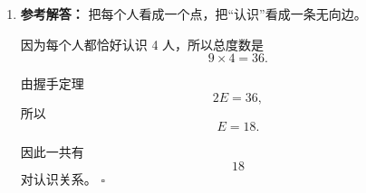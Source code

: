 \documentclass[11pt,a4paper,fontset=fandol]{ctexart}
\newenvironment{solution}{\par\noindent\textbf{参考解答：}}{\hfill$\square$\par}
\begin{document}
\begin{enumerate}
\begin{solution}
  再从 $(2,1)$ 走到 $(4,4)$：需要 2 步向右、3 步向上，所以有
  \[
  \binom53=10
  \]
  条。

  因此经过 $(2,1)$ 的最短路径共有
  \[
  3\times 10=30
  \]
  条。
  \end{solution}

  \item \begin{solution}
  把每个人看成一个点，把“认识”看成一条无向边。

  因为每个人都恰好认识 4 人，所以总度数是
  \[
  9\times 4=36.
  \]

  由握手定理
  \[
  2E=36,
  \]
  所以
  \[
  E=18.
  \]

  因此一共有
  \[
  18
  \]
  对认识关系。
  \end{solution}
\end{enumerate}
\end{document}
